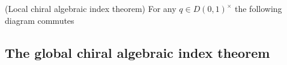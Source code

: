 \documentclass[10pt]{amsart}
\begin{document}
\begin{thm} (Local chiral algebraic index theorem) For any $q \in D(0,1)^\times$ the following diagram commutes
\ben
{}
\een
\end{thm}

\subsection{The global chiral algebraic index theorem}
\end{document}
